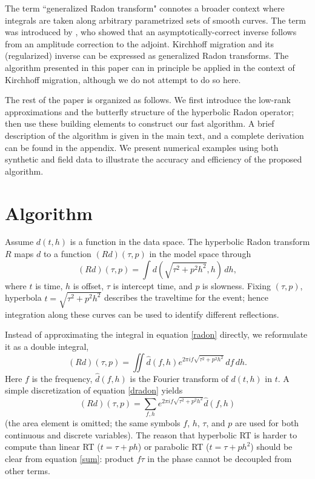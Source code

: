 The term ``generalized Radon transform" connotes a broader context where integrals are taken along arbitrary parametrized sets of smooth curves. The term was introduced by \cite{Beylkin84, Beylkin85}, who showed that an asymptotically-correct inverse follows from an amplitude correction to the adjoint. Kirchhoff migration and its (regularized) inverse can be expressed as generalized Radon transforms. The algorithm presented in this paper can in principle be applied in the context of Kirchhoff migration, although we do not attempt to do so here.

The rest of the paper is organized as follows. We first introduce the low-rank approximations and the butterfly structure of the hyperbolic Radon operator; then use these building elements to construct our fast algorithm. A brief description of the algorithm is given in the main text, and a complete derivation can be found in the appendix. We present numerical examples using both synthetic and field data to illustrate the accuracy and efficiency of the proposed algorithm.




\section{Algorithm}

Assume $d(t,h)$ is a function in the data space. The hyperbolic Radon transform $R$ maps $d$ to a function $(Rd)(\tau,p)$ in the model space \citep{TC85} through
\begin{equation} \label{radon}
(Rd)(\tau,p)=\int d(\sqrt{\tau^2+p^2h^2},h)\,dh,
\end{equation}
where $t$ is time, $h$ is offset, $\tau$ is intercept time, and $p$ is slowness. Fixing $(\tau,p)$, hyperbola $t=\sqrt{\tau^2+p^2h^2}$ describes the traveltime for the event; hence integration along these curves can be used to identify different reflections. 

Instead of approximating the integral in equation \ref{radon} directly, we reformulate it as a double integral,
\begin{equation} \label{dradon}
(Rd)(\tau,p)=\iint\hat{d}(f,h) e^{ 2\pi i
f\sqrt{\tau^2+p^2h^2} } \,df\,dh.
\end{equation}
Here $f$ is the frequency, $\hat{d}(f,h)$ is the Fourier transform of $d(t,h)$ in $t$. A simple discretization of equation \ref{dradon} yields 
\begin{equation} \label{sum}
(Rd)(\tau,p)=\sum_{f,h}  e^{ 2\pi i
 f\sqrt{\tau^2+p^2h^2} }\hat{d}(f,h)
\end{equation}
(the area element is omitted; the same symbols $f$, $h$, $\tau$, and $p$ are used for both continuous and discrete variables). The reason that hyperbolic RT is harder to compute than linear RT ($t=\tau+ph$) or parabolic RT ($t=\tau+ph^2$) should be clear from equation \ref{sum}: product $f\tau$ in the phase cannot be decoupled from other terms.

